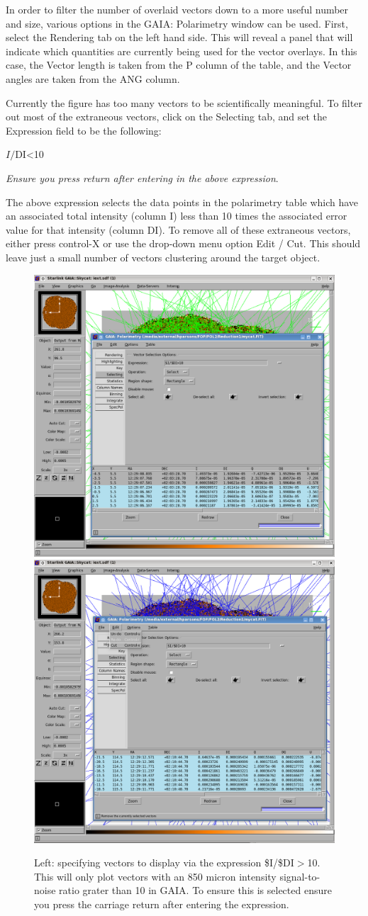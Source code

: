 In order to filter the number of overlaid vectors down to a more useful number and size,
various options in the GAIA: Polarimetry window can be used. First, select the Rendering
tab on the left hand side. This will reveal a panel that will indicate which quantities
are currently being used for the vector overlays. In this case, the Vector length is taken
from the P column of the table, and the Vector angles are taken from the ANG column.

Currently the figure has too many vectors to be scientifically meaningful. To filter
out most of the extraneous vectors, click on the Selecting tab, and set the Expression
field to be the following:

\begin{terminalv}
$I/$DI<10
\end{terminalv}

\emph{Ensure you press return after entering in the above expression}.

The above expression selects the data points in the polarimetry table which have an
associated total intensity (column I) less than 10 times the
associated error value for that intensity (column DI). To remove all of these
extraneous vectors, either press control-X or use the drop-down menu option Edit / Cut.
This should leave just a small number of vectors clustering around the target object.

\begin{figure}[t!]
\begin{center}
\includegraphics[width=0.46\linewidth]{sc22-gaia-plot-vectors-4.png}
\includegraphics[width=0.46\linewidth]{sc22-gaia-plot-vectors-6.png}
\label{fig:gaia-plot-vectors2}
\caption [Selecting Vectors in GAIA]{
  \small Left: specifying vectors to display via the expression \$I/\$DI$>$10. This will only plot
vectors with an 850 micron intensity signal-to-noise ratio grater than 10 in GAIA. To ensure this is selected
ensure you press the carriage return after entering the expression.
}
\end{center}
\end{figure}

